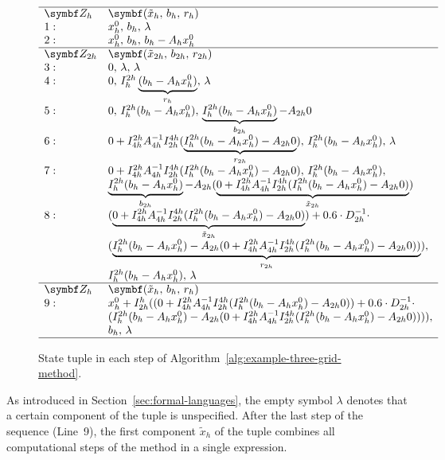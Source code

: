 \begin{figure}
	\begin{equation*}
		\begin{array}{l l}
			\hline
			\bm{Z_h} & \bm{(\tilde{x}_h, \, b_h, \, r_h)}  \\
			1: &  x_{h}^0, \, b_h, \, \lambda \\
			2: &  x_{h}^0, \, b_h, \, b_{h} - A_h x_{h}^0 \\ \hline
			\bm{Z_{2h}} &  \bm{(\tilde{x}_{2h}, \, b_{2h}, \, r_{2h})} \\
			3: &  0, \, \lambda, \, \lambda \\
			4: &  0, \, I_{h}^{2h}\underbrace{(b_{h} - A_h x_{h}^0)}_{r_{h}}, \, \lambda \\
			5: &  0, \, I_{h}^{2h}(b_{h} - A_h x_{h}^0), \,\underbrace{I_{h}^{2h}(b_{h} - A_h x_{h}^0)}_{b_{2h}} - A_{2h} 0 \\
			6: & 0 + I_{4h}^{2h} A_{4h}^{-1} I_{2h}^{4h} (\underbrace{I_{h}^{2h}(b_{h} - A_h x_{h}^0) - A_{2h} 0}_{r_{2h}}), \, I_{h}^{2h}(b_{h} - A_h x_{h}^0), \, \lambda\\
			7: & 0 + I_{4h}^{2h} A_{4h}^{-1} I_{2h}^{4h} (I_{h}^{2h}(b_{h} - A_h x_{h}^0) - A_{2h} 0), \, I_{h}^{2h}(b_{h} - A_h x_{h}^0), \\ 
			&  \underbrace{I_{h}^{2h}(b_{h} - A_h x_{h}^0)}_{b_{2h}} - A_{2h} (\underbrace{0 + I_{4h}^{2h} A_{4h}^{-1} I_{2h}^{4h} (I_{h}^{2h}(b_{h} - A_h x_{h}^0) - A_{2h} 0)}_{\tilde{x}_{2h}}) \\
			8: &   (\underbrace{0 + I_{4h}^{2h} A_{4h}^{-1} I_{2h}^{4h} (I_{h}^{2h}(b_{h} - A_h x_{h}^0) - A_{2h} 0)}_{\tilde{x}_{2h}}) + 0.6 \cdot D_{2h}^{-1} \cdot \\ 
			& (\underbrace{I_{h}^{2h}(b_{h} - A_h x_{h}^0) - A_{2h} (0 + I_{4h}^{2h} A_{4h}^{-1} I_{2h}^{4h} (I_{h}^{2h}(b_{h} - A_h x_{h}^0) - A_{2h} 0))}_{r_{2h}}), \\ 
			& I_{h}^{2h}(b_{h} - A_h x_{h}^0), \, \lambda \\ \hline 
			\bm{Z_h} & \bm{(\tilde{x}_h, \, b_h, \, r_h)}  \\
			9: & x_{h}^0 + I_{2h}^h ((0 + I_{4h}^{2h} A_{4h}^{-1} I_{2h}^{4h} (I_{h}^{2h}(b_{h} - A_h x_{h}^0) - A_{2h} 0)) + 0.6 \cdot D_{2h}^{-1} \cdot \\ 
			& (I_{h}^{2h}(b_{h} - A_h x_{h}^0) - A_{2h} (0 + I_{4h}^{2h} A_{4h}^{-1} I_{2h}^{4h} (I_{h}^{2h}(b_{h} - A_h x_{h}^0) - A_{2h} 0)))), \\ 
			&  b_h, \, \lambda \\
			\hline
		\end{array}
	\end{equation*}
	\caption{State tuple in each step of Algorithm~\ref{alg:example-three-grid-method}.}
	\label{fig:example-tree-grid-method-states}
\end{figure}
As introduced in Section~\ref{sec:formal-languages}, the empty symbol $\lambda$ denotes that a certain component of the tuple is unspecified.
After the last step of the sequence (Line~9), the first component $\tilde{x}_h$ of the tuple combines all computational steps of the method in a single expression.

